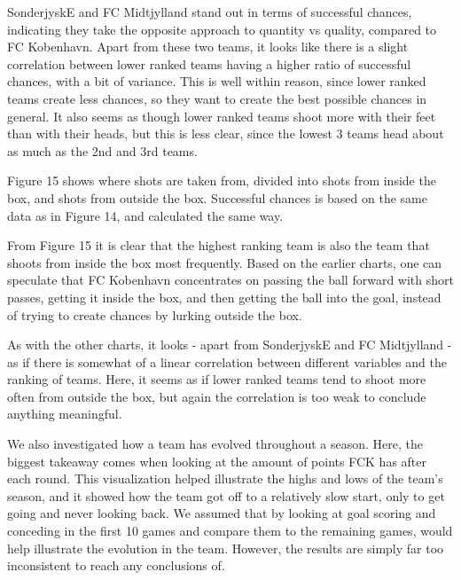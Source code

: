 \documentclass[Report.tex]{subfiles}
\begin{document}
SonderjyskE and FC Midtjylland stand out in terms of successful chances,
indicating they take the opposite approach to quantity vs quality, compared to
FC Kobenhavn. Apart from these two teams, it looks like there is a slight
correlation between lower ranked teams having a higher ratio of successful
chances, with a bit of variance. This is well within reason, since lower ranked
teams create less chances, so they want to create the best possible chances in
general. It also seems as though lower ranked teams shoot more with their feet
than with their heads, but this is less clear, since the lowest 3 teams head
about as much as the 2nd and 3rd teams. 

Figure 15 shows where shots are taken from, divided into shots from inside the
box, and shots from outside the box. Successful chances is based on the same
data as in Figure 14, and calculated the same way. 

From Figure 15 it is clear that the highest ranking team is also the team that
shoots from inside the box most frequently. Based on the earlier charts, one can
speculate that FC Kobenhavn concentrates on passing the ball forward with short
passes, getting it inside the box, and then getting the ball into the goal,
instead of trying to create chances by lurking outside the box. 

As with the other charts, it looks - apart from SonderjyskE and FC Midtjylland -
as if there is somewhat of a linear correlation between different variables and
the ranking of teams. Here, it seems as if lower ranked teams tend to shoot more
often from outside the box, but again the correlation is too weak to conclude
anything meaningful. 

We also investigated how a team has evolved throughout a season. Here, the biggest takeaway comes when looking at the amount of points FCK has after each round. This visualization helped illustrate the highs and lows of the team’s season, and it showed how the team got off to a relatively slow start, only to get going and never looking back. We assumed that by looking at goal scoring and conceding in the first 10 games and compare them to the remaining games, would help illustrate the evolution in the team. However, the results are simply far too inconsistent to reach any conclusions of. 
	
\end{document}

